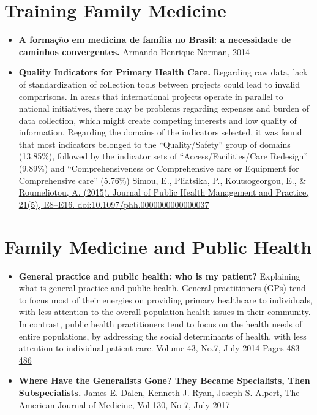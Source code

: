\documentclass[]{book}
\begin{document}
\hypertarget{training-family-medicine}{%
\section*{Training Family Medicine}\label{training-family-medicine}}

\begin{itemize}
\item
  \textbf{A formação em medicina de família no Brasil: a necessidade de caminhos convergentes.} \href{https://www.rbmfc.org.br/rbmfc/article/view/875}{Armando Henrique Norman, 2014}
\item
  \textbf{Quality Indicators for Primary Health Care.} Regarding raw data, lack of standardization of collection tools between projects could lead to invalid comparisons. In areas that international projects operate in parallel to national initiatives, there may be problems regarding expenses and burden of data collection, which might create competing interests and low quality of information. Regarding the domains of the indicators selected,
  it was found that most indicators belonged to the ``Quality/Safety'' group of domains (13.85\%), followed by the indicator sets of ``Access/Facilities/Care Redesign'' (9.89\%) and ``Comprehensiveness or Comprehensive care or Equipment for Comprehensive care''
  (5.76\%) \href{https://sci-hub.tw/10.1097/phh.0000000000000037}{Simou, E., Pliatsika, P., Koutsogeorgou, E., \& Roumeliotou, A. (2015). Journal of Public Health Management and Practice, 21(5), E8--E16. doi:10.1097/phh.0000000000000037}
\end{itemize}

\hypertarget{family-medicine-and-public-health}{%
\section*{Family Medicine and Public Health}\label{family-medicine-and-public-health}}

\begin{itemize}
\item
  \textbf{General practice and public health: who is my patient?} Explaining what is general practice and public health. General practitioners (GPs) tend to focus most of their energies on providing primary healthcare to individuals, with less attention to the overall population health issues in their community. In contrast, public health practitioners tend to focus on the health needs of entire populations, by addressing the social determinants of health, with less attention to individual patient care.
  \href{https://www.racgp.org.au/afp/2014/july/who-is-my-patient/}{Volume 43, No.7, July 2014 Pages 483-486}
\item
  \textbf{Where Have the Generalists Gone? They Became Specialists, Then Subspecialists.} \href{https://www.amjmed.com/article/S0002-9343\%2817\%2930134-1/pdf}{James E. Dalen, Kenneth J. Ryan, Joseph S. Alpert, The American Journal of Medicine, Vol 130, No 7, July 2017}
\end{itemize}
\end{document}
